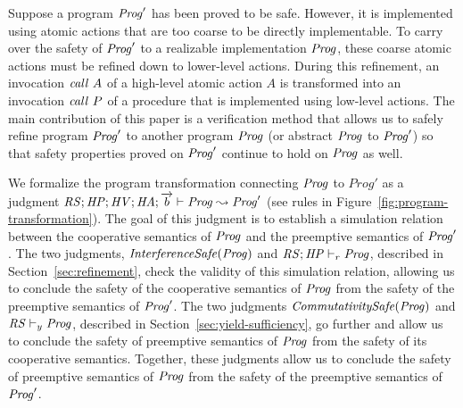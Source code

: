 
Suppose a program $\mathit{Prog}'$ has been proved to be safe.
However, it is implemented using atomic actions that are too coarse to be directly implementable.  
To carry over the safety of $\mathit{Prog}'$ to a realizable implementation $\mathit{Prog}$, 
these coarse atomic actions must be refined down to lower-level actions.
During this refinement, an invocation $\mathit{call}\ A$ of a high-level atomic action $A$ is transformed into an 
invocation $\mathit{call}\ P$ of a procedure that is implemented using low-level actions.
The main contribution of this paper is a verification method that allows us to safely refine
program $\mathit{Prog}'$ to another program $\mathit{Prog}$ (or abstract $\mathit{Prog}$ to $\mathit{Prog}'$) so that 
safety properties proved on $\mathit{Prog}'$ continue to hold on $\mathit{Prog}$ as well.

We formalize the program transformation connecting $\mathit{Prog}$ to $Prog'$ as a judgment
$\mathit{RS};\mathit{HP};\mathit{HV};\mathit{HA};\overrightarrow{b} \vdash \mathit{Prog} \leadsto \mathit{Prog}'$ 
(see rules in Figure~\ref{fig:program-transformation}).
The goal of this judgment is to establish a simulation relation between 
the cooperative semantics of $\mathit{Prog}$ and the preemptive semantics of $\mathit{Prog}'$.
The two judgments, $\mathit{InterferenceSafe}(\mathit{Prog})$ and $\mathit{RS};\mathit{HP} \vdash_r \mathit{Prog}$,
described in Section~\ref{sec:refinement}, check the validity of this simulation relation,
allowing us to conclude the safety of the cooperative semantics of $\mathit{Prog}$ from 
the safety of the preemptive semantics of $\mathit{Prog}'$.
The two judgments $\mathit{CommutativitySafe}(\mathit{Prog})$ and $\mathit{RS} \vdash_y \mathit{Prog}$,
described in Section~\ref{sec:yield-sufficiency}, go further 
and allow us to conclude the safety of preemptive semantics of $\mathit{Prog}$ from the 
safety of its cooperative semantics.
Together, these judgments allow us to conclude the safety of preemptive semantics of $\mathit{Prog}$
from the safety of the preemptive semantics of $\mathit{Prog}'$.

